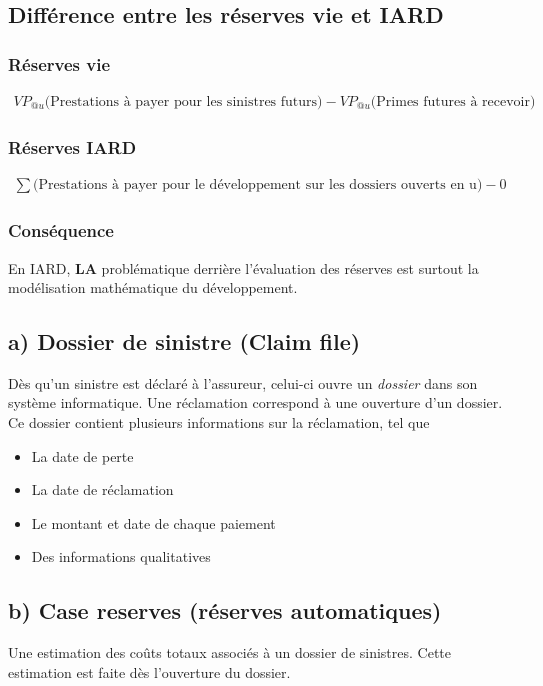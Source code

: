 \documentclass[11pt,french]{report}
\begin{document}
\subsection*{Différence entre les réserves vie et IARD}
\subsubsection*{Réserves vie}
\begin{align*}
VP_{@u}\Big(\text{Prestations à payer pour les sinistres futurs} \Big) - VP_{@u}\Big(\text{Primes futures à recevoir} \Big)
\end{align*}
\subsubsection*{Réserves IARD}

\begin{align*}
\sum \Bigg( \text{Prestations à payer pour le développement sur les dossiers ouverts en u} \Bigg) - 0
\end{align*}

\subsubsection*{Conséquence}
En IARD, \textbf{LA} problématique derrière l'évaluation des réserves est surtout la modélisation mathématique du développement.


\subsection*{a) Dossier de sinistre (Claim file)}
Dès qu'un sinistre est déclaré à l'assureur, celui-ci ouvre un \textit{dossier} dans son système informatique. Une réclamation correspond à une ouverture d'un dossier. Ce dossier contient plusieurs informations sur la réclamation, tel que
\begin{itemize}
\item La date de perte
\item La date de réclamation
\item Le montant et date de chaque paiement
\item Des informations qualitatives
\end{itemize}

\subsection*{b) Case reserves (réserves automatiques)}
Une estimation des coûts totaux associés à un dossier de sinistres. Cette estimation est faite dès l'ouverture du dossier.
\end{document}
